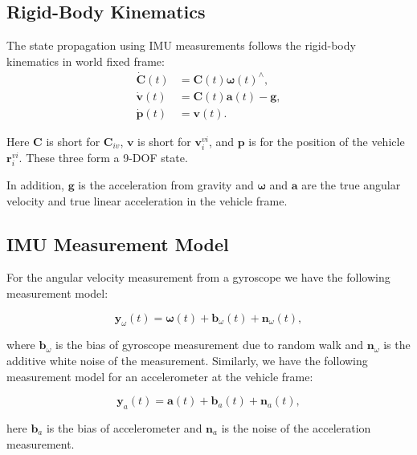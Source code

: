 \documentclass[conference]{IEEEtran}
\begin{document}
\subsection{Rigid-Body Kinematics}

The state propagation using IMU measurements follows the rigid-body kinematics in world fixed frame:
\begin{equation}
\begin{align}
    \dot{\textbf{C}}(t) &= \textbf{C}(t) \bm{\omega}(t)^\wedge, \\
    \dot{\textbf{v}}(t) &= \textbf{C}(t) \textbf{a}(t) - \textbf{g}, \\
    \dot{\textbf{p}}(t) &= \textbf{v}(t).
\end{align}
\end{equation}

Here $\textbf{C}$ is short for $\textbf{C}_{iv}$, $\textbf{v}$ is short for $\textbf{v}_i^{vi}$, and $\textbf{p}$ is for the position of the vehicle $\textbf{r}_i^{vi}$. These three form a 9-DOF state.

In addition, $\textbf{g}$ is the acceleration from gravity and $\bm{\omega}$ and $\textbf{a}$ are the true angular velocity and true linear acceleration in the vehicle frame.

\subsection{IMU Measurement Model}

For the angular velocity measurement from a gyroscope we have the following measurement model:

\begin{equation}
    \textbf{y}_\omega(t) = \bm{\omega}(t) + \textbf{b}_\omega(t) + \textbf{n}_\omega(t),
\end{equation}

\noindent where $\textbf{b}_\omega$ is the bias of gyroscope measurement due to random walk and $\textbf{n}_\omega$ is the additive white noise of the measurement. Similarly, we have the following measurement model for an accelerometer at the vehicle frame:

\begin{equation}
    \textbf{y}_a(t) = \textbf{a}(t) + \textbf{b}_a(t) + \textbf{n}_a(t),
\end{equation}

\noindent here $\textbf{b}_a$ is the bias of accelerometer and $\textbf{n}_a$ is the noise of the acceleration measurement.
\end{document}
